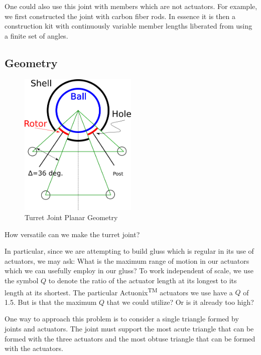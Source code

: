 \documentclass[11pt]{article}
\begin{document}
One could also use this joint with members which are not actuators. For example, we first
constructed the joint with carbon fiber rods. In essence it is then a construction kit with continuously
variable member lengths liberated from using a finite set of angles.

\subsection{Geometry}

\begin{figure}[H]
  \centering
  \includegraphics[width=0.5\textwidth]{figures/SimplifiedConstraintDrawing.png}
    \caption[Turret Joint Planar Geometry]{Turret Joint Planar Geometry}
      \label{simplified-constraint-drawing}
\end{figure}

How versatile can we make the turret joint?

In particular, since we are attempting to build gluss which is regular in its use of actuators, we may ask:
What is the maximum range of motion in our
actuators which we can usefully employ in our gluss?
To work independent of scale, we use the symbol $Q$ to denote the ratio of the actuator length at its
longest to its length at its shortest.
The particular Actuonix\textsuperscript{TM} actuators we use have a $Q$ of 1.5. But is that the maximum $Q$ that we could utilize? Or is
it already too high?

One way to approach this problem is to consider a single triangle formed by joints and actuators.
The joint must support the most acute triangle
that can be formed with the three actuators and the most obtuse triangle that can be formed with the actuators.
\end{document}
